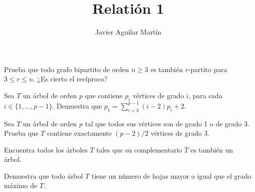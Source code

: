 \documentclass[twoside]{article}
\begin{document}
\title{Relatión 1}
\author{Javier Aguilar Martín}
\maketitle


\begin{ejercicio}{1.1}

\end{ejercicio}
\begin{solucion}
Prueba que todo grafo bipartito de orden $n \geq 3$ es también $r$-partito para $3\leq r \leq n$. ¿Es
cierto el recíproco?
\end{solucion}

\newpage


\begin{ejercicio}{1.2}
Sea $T$ un árbol de orden $p$ que contiene $p_i$ vértices de grado $i$, para cada $i \in\{1,\dots, p-1\}$. Demuestra que $p_1 =
\sum^{p-1}_{i=3} (i - 2)p_i + 2$.
\end{ejercicio}
\begin{solucion}

\end{solucion}

\newpage

\begin{ejercicio}{1.3}

Sea $T$ un árbol de orden $p$ tal que todos sus vértices son de grado 1 o de grado 3. Prueba
que $T$ contiene exactamente $(p - 2)/2$ vértices de grado 3.
\end{ejercicio}
\begin{solucion}
\end{solucion}

\newpage

\begin{ejercicio}{1.4}

Encuentra todos los árboles $T$ tales que su complementario $\overline{T}$ es también un árbol.
\end{ejercicio}
\begin{solucion}

\end{solucion}

\newpage

\begin{ejercicio}{1.5}

Demuestra que todo árbol $T$ tiene un número de hojas mayor o igual que el grado máximo
de $T$.
\end{ejercicio}
\begin{solucion}

\end{solucion}
\end{document}
